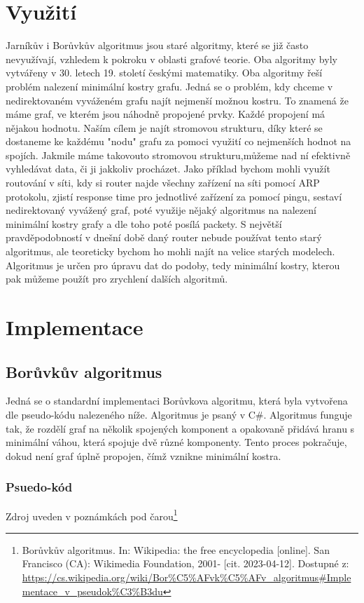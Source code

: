 \documentclass[11pt]{article}
\begin{document}
\section{Využití}
Jarníkův i Borůvkův algoritmus jsou staré algoritmy, které se již často nevyužívají, vzhledem k pokroku v oblasti grafové teorie. Oba algoritmy byly vytvářeny v 30. letech 19. století českými matematiky. Oba algoritmy řeší problém nalezení minimální kostry grafu. Jedná se o problém, kdy chceme v nedirektovaném vyváženém grafu najít nejmenší možnou kostru. To znamená že máme graf, ve kterém jsou náhodně propojené prvky. Každé propojení má nějakou hodnotu. Naším cílem je najít stromovou strukturu, díky které se dostaneme ke každému "nodu" grafu za pomoci využití co nejmenších hodnot na spojích. Jakmile máme takovouto stromovou strukturu,můžeme nad ní efektivně vyhledávat data, či ji jakkoliv procházet. Jako příklad bychom mohli využít routování v síti, kdy si router najde všechny zařízení na síti pomocí ARP protokolu, zjistí response time pro jednotlivé zařízení za pomocí pingu, sestaví nedirektovaný vyvážený graf, poté využije nějaký algoritmus na nalezení minimální kostry grafy a dle toho poté posílá packety. S největší pravděpodobností v dnešní době daný router nebude používat tento starý algoritmus, ale teoreticky bychom ho mohli najít na velice starých modelech. Algoritmus je určen pro úpravu dat do podoby, tedy minimální kostry, kterou pak můžeme použít pro zrychlení dalších algoritmů.

\pagebreak

\section{Implementace}

\subsection{Borůvkův algoritmus}
Jedná se o standardní implementaci Borůvkova algoritmu, která byla vytvořena dle pseudo-kódu nalezeného níže. Algoritmus je psaný v C\#.
Algoritmus funguje tak, že rozdělí graf na několik spojených komponent a opakovaně přidává hranu s minimální váhou, která spojuje dvě různé komponenty. Tento proces pokračuje, dokud není graf úplně propojen, čímž vznikne minimální kostra.

\subsubsection{Psuedo-kód}
Zdroj uveden v poznámkách pod čarou\footnote{Borůvkův algoritmus. In: Wikipedia: the free encyclopedia [online]. San Francisco (CA): Wikimedia Foundation, 2001- [cit. 2023-04-12]. Dostupné z: \url{https://cs.wikipedia.org/wiki/Bor\%C5\%AFvk\%C5\%AFv_algoritmus\#Implementace_v_pseudok\%C3\%B3du}}
\end{document}
